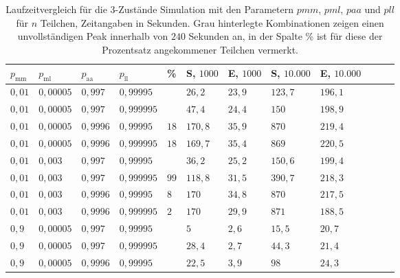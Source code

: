 \begin{table}[h]
\centering 
\caption[Laufzeitvergleich für die 3-Zustände Simulation]{Laufzeitvergleich für die 3-Zustände Simulation mit den Parametern $pmm$, $pml$, $paa$ und $pll$ für $n$ Teilchen, Zeitangaben in Sekunden. Grau hinterlegte Kombinationen zeigen einen unvollständigen Peak innerhalb von $240$ Sekunden an, in der Spalte \% ist für diese der Prozentsatz angekommener Teilchen vermerkt.}
\label{3s_laufzeit}
\begin{tabular}{|l|l|l|l||l||l|l|l|l|l|l|l|}
\hline
$p_\text{mm}$ & $p_\text{ml}$ & $p_\text{aa}$ & $p_\text{ll}$ & \%& S, $1000$ & E, $1000$ & S, $10.000$ & E, $10.000$ \\ \hline \hline
$ 0,01 $ & $0,00005$ & $0,997$  & $0,99995$  && $26,2   $ & $23,9  $ & $123,7 $ & $196,1 $  \\ \hline
$ 0,01 $ & $0,00005$ & $0,997$  & $0,999995$ && $47,4   $ & $24,4  $ & $150   $ & $198,9 $  \\ \hline
\cellcolor{gray!25}$ 0,01 $ & \cellcolor{gray!25}$0,00005$ &\cellcolor{gray!25} $0,9996$ &\cellcolor{gray!25} $0,99995$  &$18$& $170,8 $ & $35,9  $ & $870   $ & $219,4 $  \\ \hline
\cellcolor{gray!25}$ 0,01 $ & \cellcolor{gray!25}$0,00005$ &\cellcolor{gray!25} $0,9996$ & \cellcolor{gray!25}$0,999995$ &$18$& $169,7 $ & $35,4  $ & $869   $ & $220,5 $  \\ \hline
$ 0,01 $ & $0,003 $  & $0,997$  & $0,99995$  && $36,2   $ & $25,2  $ & $150,6 $ & $199,4 $  \\ \hline
\cellcolor{gray!25}$ 0,01 $ & \cellcolor{gray!25}$0,003 $  & \cellcolor{gray!25}$0,997$  & \cellcolor{gray!25}$0,999995$ &$99$& $118,8$ & $31,5  $ & $390,7 $ & $218,3 $  \\ \hline
\cellcolor{gray!25}$ 0,01 $ & \cellcolor{gray!25}$0,003 $  & \cellcolor{gray!25}$0,9996$ & \cellcolor{gray!25}$0,99995$  &$8$& $170   $ & $34,8  $ & $870   $ & $217,5 $  \\ \hline
\cellcolor{gray!25}$ 0,01 $ & \cellcolor{gray!25}$0,003 $  & \cellcolor{gray!25}$0,9996$ & \cellcolor{gray!25}$0,999995$ &$2$& $170   $ & $29,9  $ & $871   $ & $188,5 $  \\ \hline
$ 0,9  $ & $0,00005$ & $0,997$  & $0,99995$  && $5      $ & $2,6 $   & $15,5  $ & $20,7 $  \\ \hline
$ 0,9  $ & $0,00005$ & $0,997$  & $0,999995$ && $28,4   $ & $2,7 $   & $44,3  $ & $21,4 $  \\ \hline
$ 0,9  $ & $0,00005$ & $0,9996$ & $0,99995$  && $22,5   $ & $3,9 $   & $98    $ & $24,3 $  \\ \hline

\end{tabular}
\end{table}
